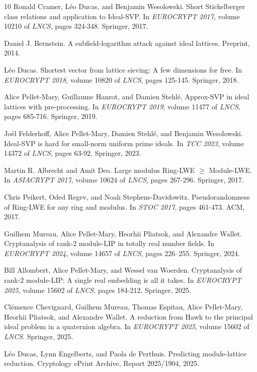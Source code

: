 \documentclass[11pt,a4paper]{article}
\theoremstyle{plain}
\theoremstyle{definition}
\theoremstyle{remark}
\begin{document}
\begin{thebibliography}{10}
Ronald Cramer, L\'{e}o Ducas, and Benjamin Wesolowski.
 Short {S}tickelberger class relations and application to {Ideal-SVP}.
 In {\em EUROCRYPT 2017}, volume 10210 of {\em LNCS}, pages 324-348. Springer, 2017.

Daniel J. Bernstein.
 A subfield-logarithm attack against ideal lattices.
 Preprint, 2014.

L\'{e}o Ducas.
 Shortest vector from lattice sieving: A few dimensions for free.
 In {\em EUROCRYPT 2018}, volume 10820 of {\em LNCS}, pages 125-145. Springer, 2018.

Alice Pellet-Mary, Guillaume Hanrot, and Damien Stehl\'{e}.
 Approx-{SVP} in ideal lattices with pre-processing.
 In {\em EUROCRYPT 2019}, volume 11477 of {\em LNCS}, pages 685-716. Springer, 2019.

Jo\"{e}l Felderhoff, Alice Pellet-Mary, Damien Stehl\'{e}, and Benjamin Wesolowski.
 {Ideal-SVP} is hard for small-norm uniform prime ideals.
 In {\em TCC 2023}, volume 14372 of {\em LNCS}, pages 63-92. Springer, 2023.

Martin R. Albrecht and Amit Deo.
 Large modulus {Ring-LWE} $\geq$ {Module-LWE}.
 In {\em ASIACRYPT 2017}, volume 10624 of {\em LNCS}, pages 267-296. Springer, 2017.

Chris Peikert, Oded Regev, and Noah Stephens-Davidowitz.
 Pseudorandomness of {Ring-LWE} for any ring and modulus.
 In {\em STOC 2017}, pages 461-473. ACM, 2017.

Guilhem Mureau, Alice Pellet-Mary, Heorhii Pliatsok, and Alexandre Wallet.
 Cryptanalysis of rank-2 module-{LIP} in totally real number fields.
 In {\em EUROCRYPT 2024}, volume 14657 of {\em LNCS}, pages 226--255. Springer, 2024.

Bill Allombert, Alice Pellet-Mary, and Wessel van Woerden.
 Cryptanalysis of rank-2 module-{LIP}: A single real embedding is all it takes.
 In {\em EUROCRYPT 2025}, volume 15602 of {\em LNCS}, pages 184-212. Springer, 2025.

Cl\'{e}mence Chevignard, Guilhem Mureau, Thomas Espitau, Alice Pellet-Mary, Heorhii Pliatsok, and Alexandre Wallet.
 A reduction from {Hawk} to the principal ideal problem in a quaternion algebra.
 In {\em EUROCRYPT 2025}, volume 15602 of {\em LNCS}. Springer, 2025.

L\'{e}o Ducas, Lynn Engelberts, and Paola de Perthuis.
 Predicting module-lattice reduction.
 Cryptology ePrint Archive, Report 2025/1904, 2025.


\end{thebibliography}
\end{document}

